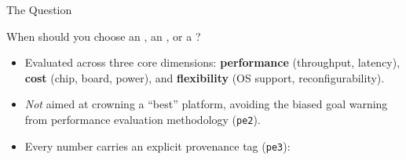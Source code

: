 
\begin{frame}{The Question}
\begin{center}
{\Large When should you choose an \MCU, an \FPGA, or a \SoC?}
\end{center}
\bigskip
\begin{itemize}\setlength{\itemsep}{6pt}
\item Evaluated across three core dimensions: \textbf{performance} (throughput, latency), \textbf{cost} (chip, board, power), and \textbf{flexibility} (OS support, reconfigurability).
\item \emph{Not} aimed at crowning a ``best'' platform, avoiding the biased goal warning from performance evaluation methodology (\texttt{pe2}).
\item Every number carries an explicit provenance tag (\texttt{pe3}):\\
          
\end{itemize}
\end{frame}

